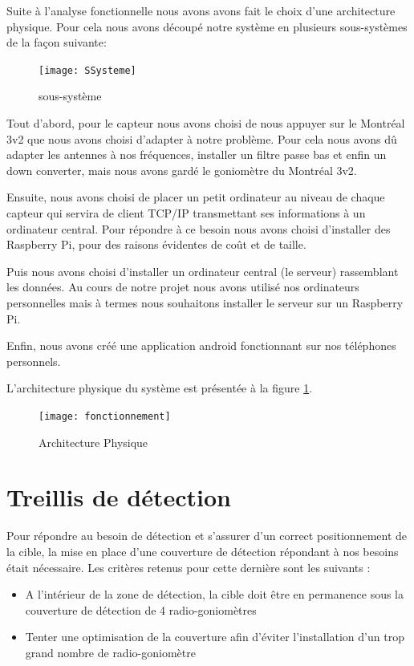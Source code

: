 Suite à l'analyse fonctionnelle nous avons avons fait le choix d'une architecture physique.
Pour cela nous avons découpé notre système en plusieurs sous-systèmes de la façon suivante:

\begin{figure}[h]
  \centering
  \texttt{[image: SSysteme]}
  \caption{sous-système}
\end{figure}

Tout d'abord, pour le capteur nous avons choisi de nous appuyer sur le Montréal 3v2 que nous avons choisi d'adapter à notre problème. Pour cela nous avons dû adapter les antennes à nos fréquences, installer un filtre passe bas et enfin un down converter, mais nous avons gardé le goniomètre du Montréal 3v2.

Ensuite, nous avons choisi de placer un petit ordinateur au niveau de chaque capteur qui servira de client TCP/IP transmettant ses informations à un ordinateur central. Pour répondre à ce besoin nous avons choisi d'installer des Raspberry Pi, pour des raisons évidentes de coût et de taille.

Puis nous avons choisi d'installer un ordinateur central (le serveur) rassemblant les données. Au cours de notre projet nous avons utilisé nos ordinateurs personnelles mais à termes nous souhaitons installer le serveur sur un Raspberry Pi.

Enfin, nous avons créé une application android fonctionnant sur nos téléphones personnels.


L'architecture physique du système est présentée à la figure \ref{fig:arch_phys}.

\begin{figure}[h]
  \centering
  \texttt{[image: fonctionnement]}
  \caption{Architecture Physique}
  \label{fig:arch_phys}
\end{figure}



\section{Treillis de détection}

Pour répondre au besoin de détection et s’assurer d’un correct positionnement de la cible, la mise en
place d’une couverture de détection répondant à nos besoins était nécessaire. Les critères retenus
pour cette dernière sont les suivants :

\begin{itemize}
\item A l’intérieur de la zone de détection, la cible doit être en permanence sous la couverture de détection de 4 radio-goniomètres
\item Tenter une optimisation de la couverture afin d’éviter l’installation d’un trop grand
nombre de radio-goniomètre
\end{itemize}

